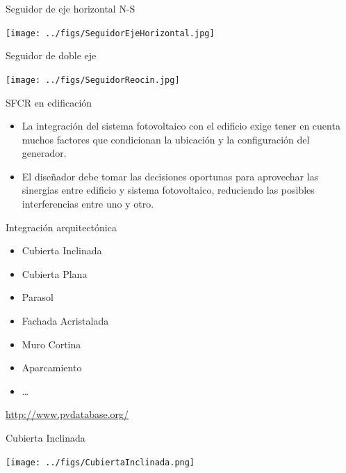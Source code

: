 \documentclass[xcolor={usenames,svgnames,dvipsnames}]{beamer}
\begin{document}
\begin{frame}[label={sec:org0d65a84}]{Seguidor de eje horizontal N-S}
\begin{center}
\texttt{[image: ../figs/SeguidorEjeHorizontal.jpg]}
\end{center}
\end{frame}


\begin{frame}[label={sec:orgf5bcf98}]{Seguidor de doble eje}
\begin{center}
\texttt{[image: ../figs/SeguidorReocin.jpg]}
\end{center}
\end{frame}

\begin{frame}[label={sec:org7dd45db}]{SFCR en edificación}
\begin{itemize}
\item La integración del sistema fotovoltaico con el edificio exige tener en cuenta muchos factores que condicionan la ubicación y la configuración del generador.

\item El diseñador debe tomar las decisiones oportunas para \alert{aprovechar las sinergias entre edificio y sistema fotovoltaico}, reduciendo las posibles interferencias entre uno y otro.
\end{itemize}
\end{frame}

\begin{frame}[label={sec:org2b85bbe}]{Integración arquitectónica}
\begin{itemize}
\item Cubierta Inclinada
\item Cubierta Plana
\item Parasol
\item Fachada Acristalada
\item Muro Cortina
\item Aparcamiento
\item \ldots{}
\end{itemize}

\begin{block}{}
\url{http://www.pvdatabase.org/}
\end{block}
\end{frame}

\begin{frame}[label={sec:org2e67e62}]{Cubierta Inclinada}
\begin{center}
\texttt{[image: ../figs/CubiertaInclinada.png]}
\end{center}
\end{frame}
\end{document}
